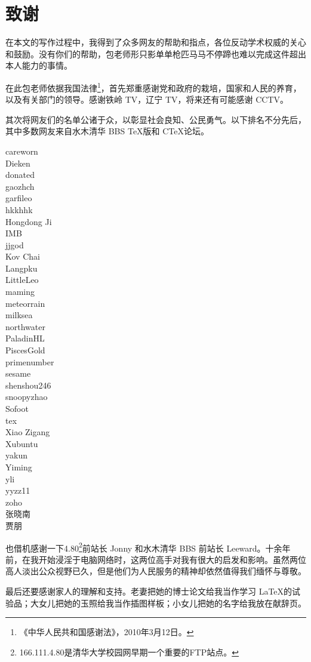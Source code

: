 \chapter{致谢}

在本文的写作过程中，我得到了众多网友的帮助和指点，各位反动学术权威的关心和鼓励。没有你们的帮助，包老师形只影单单枪匹马马不停蹄也难以完成这件超出本人能力的事情。

在此包老师依据我国法律\footnote{《中华人民共和国感谢法》，2010年3月12日。}，首先郑重感谢党和政府的栽培，国家和人民的养育，以及有关部门的领导。感谢铁岭 TV，辽宁 TV，将来还有可能感谢 CCTV。

其次将网友们的名单公诸于众，以彰显社会良知、公民勇气。以下排名不分先后，其中多数网友来自水木清华 BBS \TeX 版和 C\TeX 论坛。

\begin{multicols}{3}
\noindent
careworn\\
Dieken\\
donated\\
gaozhch\\
garfileo\\
hkkhhk\\
Hongdong Ji\\
IMB\\
jjgod\\
Kov Chai\\
Langpku\\
LittleLeo\\
maming\\
meteorrain\\
milksea\\
northwater\\
PaladinHL\\
PiscesGold\\
primenumber\\
sesame\\
shenshou246\\
snoopyzhao\\
Sofoot\\
tex\\
Xiao Zigang\\
Xubuntu\\
yakun\\
Yiming\\
yli\\
yyzz11\\
zoho\\
张晓南\\
贾朋
\end{multicols}

也借机感谢一下4.80\footnote{166.111.4.80是清华大学校园网早期一个重要的FTP站点。}前站长 Jonny 和水木清华 BBS 前站长 Leeward。十余年前，在我开始浸淫于电脑网络时，这两位高手对我有很大的启发和影响。虽然两位高人淡出公众视野已久，但是他们为人民服务的精神却依然值得我们缅怀与尊敬。

最后还要感谢家人的理解和支持。老妻把她的博士论文给我当作学习 \LaTeX 的试验品；大女儿把她的玉照给我当作插图样板；小女儿把她的名字给我放在献辞页。